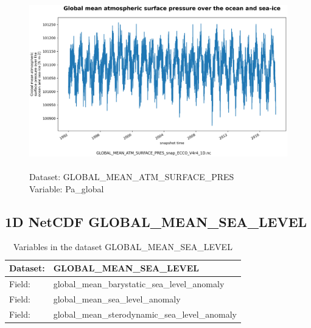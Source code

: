 \begin{figure}[H]
\centering
\includegraphics[scale=0.5]{../images/plots/oneD_plots/Global_Mean_Atmospheric_Pressure/Pa_global.png}
\caption{\\Dataset: GLOBAL\_MEAN\_ATM\_SURFACE\_PRES\\Variable: Pa\_global}
\label{tab:table-GLOBAL_MEAN_ATM_SURFACE_PRES_Pa_global-Plot}
\end{figure}
\pagebreak
\subsection{1D NetCDF GLOBAL\_MEAN\_SEA\_LEVEL}
\newp
\begin{longtable}{|p{}|p{}|}
\caption{Variables in the dataset GLOBAL\_MEAN\_SEA\_LEVEL}
\label{tab:table-GLOBAL_MEAN_SEA_LEVEL-fields} \\ 
\hline \endhead \hline \endfoot
\rowcolor{lightgray} \textbf{Dataset:} & \textbf{GLOBAL\_MEAN\_SEA\_LEVEL} \\ \hline
Field: &global\_mean\_barystatic\_sea\_level\_anomaly \\ \hline
Field: &global\_mean\_sea\_level\_anomaly \\ \hline
Field: &global\_mean\_sterodynamic\_sea\_level\_anomaly \\ \hline
\end{longtable}

\pagebreak
